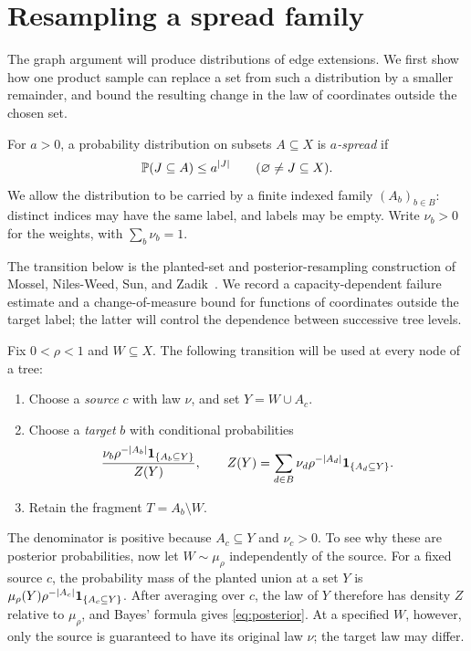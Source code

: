 \section{Resampling a spread family}\label{sec:resampling}

The graph argument will produce distributions of edge extensions. We first
show how one product sample can replace a set from such a distribution
by a smaller remainder, and bound the resulting change in the law of
coordinates outside the chosen set.

For $a>0$, a probability distribution on subsets $A\subseteq X$ is
\emph{$a$-spread} if
\begin{equation}\label{eq:spread}
 \mathbb P(J\subseteq A)\le a^{|J|}
 \qquad(\varnothing\ne J\subseteq X).
\end{equation}
We allow the distribution to be carried by a finite indexed family
$(A_b)_{b\in B}$: distinct indices may have the same label, and labels
may be empty. Write $\nu_b>0$ for the weights, with $\sum_b\nu_b=1$.

The transition below is the planted-set and posterior-resampling
construction of Mossel, Niles-Weed, Sun, and Zadik~\cite[Sections~2.1--2.3]{MNSZ25}.
We record a capacity-dependent failure estimate and a change-of-measure
bound for functions of coordinates outside the target label; the latter
will control the dependence between successive tree levels.

Fix $0<\rho<1$ and $W\subseteq X$. The following transition will be
used at every node of a tree:
\begin{enumerate}[label=\arabic*.,leftmargin=2em,itemsep=2pt]
 \item Choose a \emph{source} $c$ with law $\nu$, and set $Y=W\cup A_c$.
 \item Choose a \emph{target} $b$ with conditional probabilities
 \begin{equation}\label{eq:posterior}
  \frac{\nu_b\rho^{-|A_b|}\mathbf 1_{\{A_b\subseteq Y\}}}{Z(Y)},
  \qquad
  Z(Y)=\sum_{d\in B}\nu_d\rho^{-|A_d|}
                  \mathbf 1_{\{A_d\subseteq Y\}}.
 \end{equation}
 \item Retain the fragment $T=A_b\setminus W$.
\end{enumerate}
The denominator is positive because $A_c\subseteq Y$ and $\nu_c>0$.
To see why these are posterior probabilities, now let $W\sim\mu_\rho$
independently of the source. For a fixed source $c$, the probability
mass of the planted union at a set $Y$ is
$\mu_\rho(Y)\rho^{-|A_c|}\mathbf 1_{\{A_c\subseteq Y\}}$.
After averaging over $c$, the law of $Y$ therefore has density $Z$
relative to $\mu_\rho$, and Bayes' formula gives
\eqref{eq:posterior}. At a specified $W$, however, only the source
is guaranteed to have its original law $\nu$; the target law may differ.

